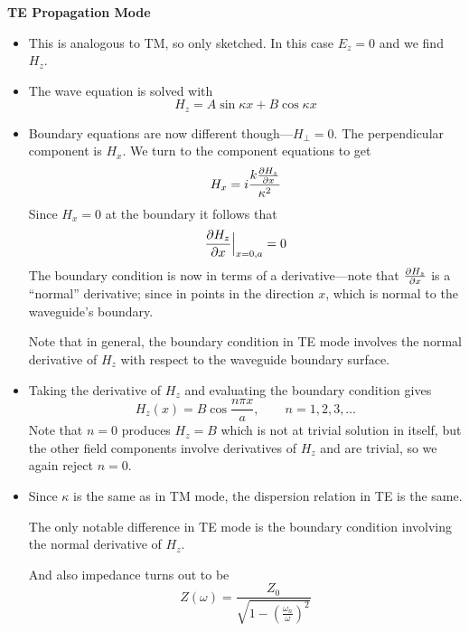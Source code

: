 \documentclass[11pt, a4paper]{article}
\begin{document}
\textbf{TE Propagation Mode}
\begin{itemize}
	\item This is analogous to TM, so only sketched. In this case $ E_{z} = 0 $ and we find $ H_{z} $. 
	
	\item The wave equation is solved with
	\begin{equation*}
		H_{z} = A \sin \kappa x + B \cos \kappa x
	\end{equation*}
	
	\item Boundary equations are now different though---$ H_{\perp} = 0 $. The perpendicular component is $ H_{x} $. We turn to the component equations to get
	\begin{equation*}
		H_{x} = i \frac{k \pdv{H_{z}}{x}}{\kappa^{2}}
	\end{equation*}
	Since $ H_{x} = 0 $ at the boundary it follows that
	\begin{equation*}
		\pdv{H_{z}}{x}\Big|_{x = 0, a} = 0
	\end{equation*}
	The boundary condition is now in terms of a derivative---note that $ \pdv{H_{z}}{x} $ is a ``normal'' derivative; since in points in the direction $ x $, which is normal to the waveguide's boundary. 
	
	Note that in general, the boundary condition in TE mode involves the normal derivative of $ H_{z} $ with respect to the waveguide boundary surface. 
	
	\item Taking the derivative of $ H_{z} $ and evaluating the boundary condition gives
	\begin{equation*}
		H_{z}(x) = B\cos \frac{n\pi x}{a}, \qquad n = 1, 2, 3, \ldots
	\end{equation*}
	Note that $ n = 0 $ produces $ H_{z} = B $ which is not at trivial solution  in itself, but the other field components involve derivatives of $ H_{z} $ and are trivial, so we again reject $ n = 0 $. 
	
	\item Since $ \kappa $ is the same as in TM mode, the dispersion relation in TE is the same. 
	
	The only notable difference in TE mode is the boundary condition involving the normal derivative of $ H_{z} $. 
	
	And also impedance turns out to be
	\begin{equation*}
		Z(\omega) = \frac{Z_{0}}{\sqrt{1 - \left(\frac{\omega_{n}}{\omega}\right)^{2}}}
	\end{equation*}
	
\end{itemize}
\end{document}
